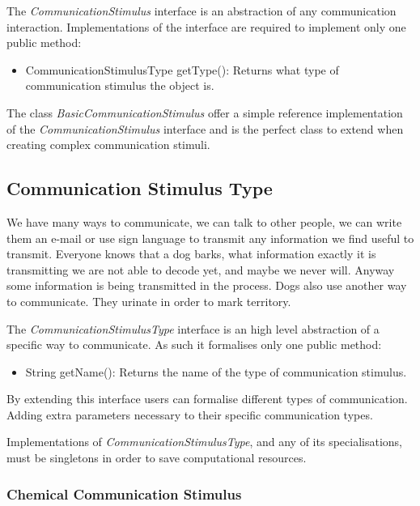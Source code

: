 The \emph{CommunicationStimulus} interface is an abstraction of any communication interaction. Implementations of the interface are required to implement only one public method:

\begin{itemize}
  \item CommunicationStimulusType getType(): Returns what type of communication stimulus the object is.
\end{itemize}

The class \emph{BasicCommunicationStimulus} offer a simple reference implementation of the \emph{CommunicationStimulus} interface and is the perfect class to extend when creating complex communication stimuli.

\subsection{Communication Stimulus Type}

We have many ways to communicate, we can talk to other people, we can write them an e-mail or use sign language to transmit any information we find useful to transmit. Everyone knows that a dog barks, what information exactly it is transmitting we are not able to decode yet, and maybe we never will. Anyway some information is being transmitted in the process. Dogs also use another way to communicate. They urinate in order to mark territory.

The \emph{CommunicationStimulusType} interface is an high level abstraction of a specific way to communicate. As such it formalises only one public method:

\begin{itemize}
  \item String getName(): Returns the name of the type of communication stimulus.
\end{itemize}

By extending this interface users can formalise different types of communication. Adding extra parameters necessary to their specific communication types.

Implementations of \emph{CommunicationStimulusType}, and any of its specialisations, must be singletons in order to save computational resources.

\subsubsection{Chemical Communication Stimulus}
\label{subsec:chemical-stimulus}

